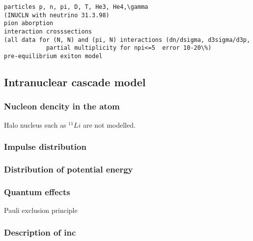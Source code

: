 

\begin{verbatim}
particles p, n, pi, D, T, He3, He4,\gamma
(INUCLN with neutrino 31.3.98)
pion aborption
interaction crosssections
(all data for (N, N) and (pi, N) interactions (dn/dsigma, d3sigma/d3p, 
            partial multiplicity for npi<=5  error 10-20\%)
pre-equilibrium exiton model 
\end{verbatim}

\subsection{Intranuclear cascade model}

\subsubsection{Nucleon dencity in the atom}

Halo nucleus such as $^{11}Li$ are not modelled.

\subsubsection{Impulse distribution}

\subsubsection{Distribution of potential energy}

\subsubsection{Quantum effects}
Pauli exclusion principle

\subsubsection{Description of inc}


